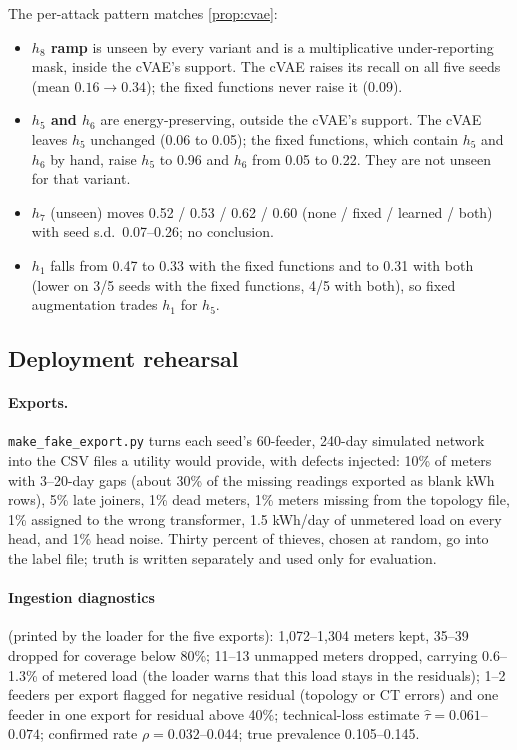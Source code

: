 \documentclass[11pt,a4paper]{article}
\theoremstyle{plain}
\theoremstyle{definition}
\theoremstyle{remark}
\begin{document}
The per-attack pattern matches \cref{prop:cvae}:
\begin{itemize}
\item \textbf{$h_8$ ramp} is unseen by every variant and is a multiplicative under-reporting mask, inside the cVAE's support. The cVAE raises its recall on all five seeds (mean $0.16\to0.34$); the fixed functions never raise it (0.09).
\item \textbf{$h_5$ and $h_6$} are energy-preserving, outside the cVAE's support. The cVAE leaves $h_5$ unchanged (0.06 to 0.05); the fixed functions, which contain $h_5$ and $h_6$ by hand, raise $h_5$ to 0.96 and $h_6$ from 0.05 to 0.22. They are not unseen for that variant.
\item \textbf{$h_7$} (unseen) moves 0.52 / 0.53 / 0.62 / 0.60 (none / fixed / learned / both) with seed s.d.\ 0.07--0.26; no conclusion.
\item \textbf{$h_1$} falls from 0.47 to 0.33 with the fixed functions and to 0.31 with both (lower on 3/5 seeds with the fixed functions, 4/5 with both), so fixed augmentation trades $h_1$ for $h_5$.
\end{itemize}

\subsection{Deployment rehearsal}
\label{sec:rehearsal}
\paragraph{Exports.} \texttt{make\_fake\_export.py} turns each seed's 60-feeder, 240-day simulated network into the CSV files a utility would provide, with defects injected: 10\% of meters with 3--20-day gaps (about 30\% of the missing readings exported as blank kWh rows), 5\% late joiners, 1\% dead meters, 1\% meters missing from the topology file, 1\% assigned to the wrong transformer, 1.5 kWh/day of unmetered load on every head, and 1\% head noise. Thirty percent of thieves, chosen at random, go into the label file; truth is written separately and used only for evaluation.

\paragraph{Ingestion diagnostics} (printed by the loader for the five exports): 1{,}072--1{,}304 meters kept, 35--39 dropped for coverage below 80\%; 11--13 unmapped meters dropped, carrying 0.6--1.3\% of metered load (the loader warns that this load stays in the residuals); 1--2 feeders per export flagged for negative residual (topology or CT errors) and one feeder in one export for residual above 40\%; technical-loss estimate $\hat\tau=0.061$--$0.074$; confirmed rate $\rho=0.032$--$0.044$; true prevalence 0.105--0.145.
\end{document}

